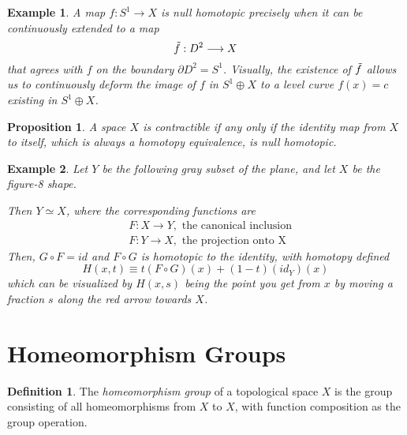 \documentclass{article}
\newtheorem{proposition}[theorem]{Proposition}
\newtheorem{example}{Example}[section]
\theoremstyle{remark}
\theoremstyle{definition}
\newtheorem{definition}{Definition}[section]
\begin{document}
    \begin{example}
    A map $f: S^1 \longrightarrow X$ is null homotopic precisely when it can be continuously extended to a map 
    \[\Tilde{f}: D^2 \longrightarrow X\]
    that agrees with $f$ on the boundary $\partial D^2 = S^1$. Visually, the existence of $\Tilde{f}$ allows us to continuously deform the image of $f$ in $S^1 \oplus X$ to a level curve $f(x) = c$ existing in $S^1 \oplus X$. 
    \end{example}

    \begin{proposition}
    A space $X$ is contractible if any only if the identity map from $X$ to itself, which is always a homotopy equivalence, is null homotopic. 
    \end{proposition}

    \begin{example}
      Let $Y$ be the following gray subset of the plane, and let $X$ be the figure-8 shape. 
      \begin{center}
    \end{center}
    Then $Y \simeq X$, where the corresponding functions are
    \begin{align*}
        & F: X \longrightarrow Y, \text{ the canonical inclusion} \\
        & F: Y \longrightarrow X, \text{ the projection onto X}
    \end{align*}
    Then, $G \circ F = id$ and $F \circ G$ is homotopic to the identity, with homotopy defined
    \[H(x, t) \equiv t (F \circ G) (x) + (1-t) (id_Y) (x)\]
    which can be visualized by $H(x, s)$ being the point you get from $x$ by moving a fraction $s$ along the red arrow towards $X$. 
    \end{example}

\section{Homeomorphism Groups}

  \begin{definition}
    The \textit{homeomorphism group} of a topological space $X$ is the group consisting of all homeomorphisms from $X$ to $X$, with function composition as the group operation.
    \end{definition}
\end{document}
